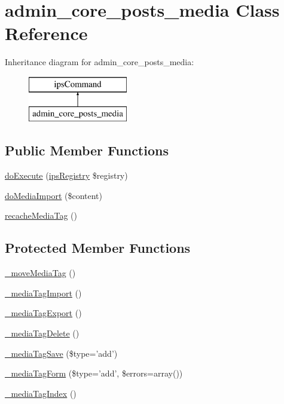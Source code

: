 \hypertarget{classadmin__core__posts__media}{\section{admin\-\_\-core\-\_\-posts\-\_\-media Class Reference}
\label{classadmin__core__posts__media}
}
Inheritance diagram for admin\-\_\-core\-\_\-posts\-\_\-media\-:\begin{figure}[H]
\begin{center}
\leavevmode
\includegraphics[height=2.000000cm]{classadmin__core__posts__media}
\end{center}
\end{figure}
\subsection*{Public Member Functions}
\begin{DoxyCompactItemize}
\item 
\hyperlink{classadmin__core__posts__media_afbc4e912a0604b94d47d66744c64d8ba}{do\-Execute} (\hyperlink{classips_registry}{ips\-Registry} \$registry)
\item 
\hyperlink{classadmin__core__posts__media_abb2b0939f7947c95c98702d2222442b0}{do\-Media\-Import} (\$content)
\item 
\hyperlink{classadmin__core__posts__media_ae9c08a5d34ae6ec0459ca4e370ef4cc4}{recache\-Media\-Tag} ()
\end{DoxyCompactItemize}
\subsection*{Protected Member Functions}
\begin{DoxyCompactItemize}
\item 
\hyperlink{classadmin__core__posts__media_a15729ab39b7940b377935de1d936b7ba}{\-\_\-move\-Media\-Tag} ()
\item 
\hyperlink{classadmin__core__posts__media_added6865a5097091f91f0d673094a976}{\-\_\-media\-Tag\-Import} ()
\item 
\hyperlink{classadmin__core__posts__media_a1e5c31e7572056440170bee743cbcd25}{\-\_\-media\-Tag\-Export} ()
\item 
\hyperlink{classadmin__core__posts__media_a35cc060377e06d36e53bc3285277db9a}{\-\_\-media\-Tag\-Delete} ()
\item 
\hyperlink{classadmin__core__posts__media_afc35b8e68fb5ef9a2b0a04e156edd864}{\-\_\-media\-Tag\-Save} (\$type='add')
\item 
\hyperlink{classadmin__core__posts__media_a7de358bedcead8733161eac864342401}{\-\_\-media\-Tag\-Form} (\$type='add', \$errors=array())
\item 
\hyperlink{classadmin__core__posts__media_aeedf5f7ac0d0fed55b95aae66778e7d0}{\-\_\-media\-Tag\-Index} ()
\end{DoxyCompactItemize}
